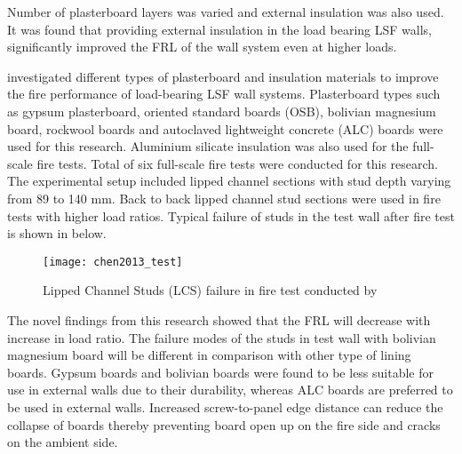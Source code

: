 Number of plasterboard layers was varied and external insulation was also used. It was found that providing external insulation in the load bearing LSF walls, significantly improved the FRL of the wall system even at higher loads.  

\citet{Chen2013} investigated different types of plasterboard and insulation materials to improve the fire performance of load-bearing LSF wall systems. Plasterboard types such as gypsum plasterboard, oriented standard boards (OSB), bolivian magnesium board, rockwool boards and autoclaved lightweight concrete (ALC) boards were used for this research. Aluminium silicate insulation was also used for the full-scale fire tests. Total of six full-scale fire tests were conducted for this research. The experimental setup included lipped channel sections with stud depth varying from 89 to 140 mm. Back to back lipped channel stud sections were used in fire tests with higher load ratios. Typical failure of studs in the test wall after fire test is shown in  below. 
\begin{figure}[htbp]
	\centering
		\texttt{[image: chen2013\_test]}		
		\caption{Lipped Channel Studs (LCS) failure in fire test conducted by \citet{Chen2013}}
		\label{fig:chen2013_test}
\end{figure}
The novel findings from this research showed that the FRL will decrease with increase in load ratio. The failure modes of the studs in test wall with bolivian magnesium board will be different in comparison with other type of lining boards. Gypsum boards and bolivian boards were found to be less suitable for use in external walls due to their durability, whereas ALC boards are preferred to be used in external walls. Increased screw-to-panel edge distance can reduce the collapse of boards thereby preventing board open up on the fire side and cracks on the ambient side. 

